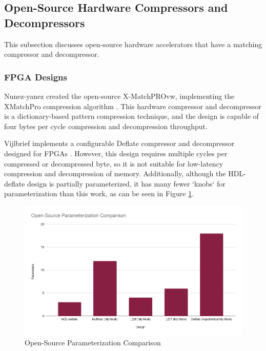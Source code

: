 \documentclass[doublespace,nopageskip]{VTthesis}
\begin{document}
\subsection{Open-Source Hardware Compressors and Decompressors}\label{ss:open-source_hardware_compressors_and_decompressors}
This subsection discusses open-source hardware accelerators that have a matching compressor and decompressor.

\subsubsection{FPGA Designs}\label{sss:open_fpga_designs}
Nunez-yanez created the open-source X-MatchPROvw, implementing the XMatchPro compression algorithm \cite{xmatchpro}. This hardware compressor and decompressor is a dictionary-based pattern compression technique, and the design is capable of four bytes per cycle compression and decompression throughput.

Vijlbrief implements a configurable Deflate compressor and decompressor designed for FPGAs \cite{hdldeflate}. However, this design requires multiple cycles per compressed or decompressed byte, so it is not suitable for low-latency compression and decompression of memory. Additionally, although the HDL-deflate design is partially parameterized, it has many fewer `knobs` for parameterization than this work, as can be seen in Figure \ref{fig:open-source_parameterization_comparison}.

\begin{figure}[htb]
	\centering
	\includegraphics[scale=0.44]{Open-Source Parameterization Comparison.png}
	\caption{Open-Source Parameterization Comparison}
	\label{fig:open-source_parameterization_comparison}
\end{figure}
\end{document}

